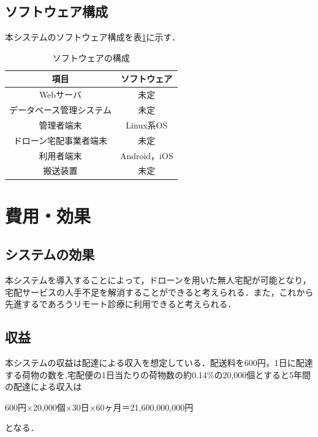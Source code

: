 \documentclass[a4paper, titlepage]{jsarticle}
\begin{document}
\subsection{ソフトウェア構成}
本システムのソフトウェア構成を表\ref{fig:software}に示す．
\begin{table}[H]
        \begin{center}
                \caption{ソフトウェアの構成}
                \label{fig:software}
                \begin{tabular}{cc} \hline
                        項目           & ソフトウェア      \\ \hline \hline
                        Webサーバ       & 未定          \\
                        データベース管理システム & 未定          \\
                        管理者端末        & Linux系OS    \\
                        ドローン宅配事業者端末  & 未定          \\
                        利用者端末        & Android，iOS \\
                        搬送装置         & 未定          \\ \hline
                \end{tabular}
        \end{center}
\end{table}

\section{費用・効果}
\subsection{システムの効果}
本システムを導入することによって，ドローンを用いた無人宅配が可能となり，宅配サービスの人手不足を解消することができると考えられる．また，これから先進するであろうリモート診療に利用できると考えられる．

\subsection{収益}
本システムの収益は配達による収入を想定している．配送料を600円，1日に配達する荷物の数を,宅配便の1日当たりの荷物数の約0.14\%の20,000個とすると5年間の配達による収入は
\begin{center}
        600円×20,000個×30日×60ヶ月＝21,600,000,000円
\end{center}
となる．
\end{document}
